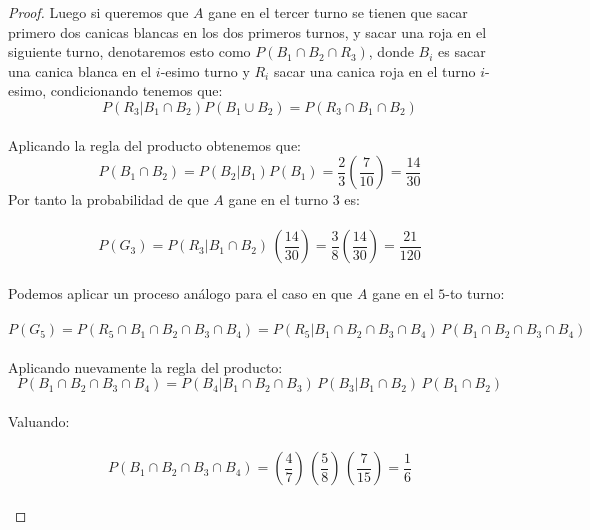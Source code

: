 \documentclass[11pt,letterpaper]{article}
\begin{document}
\begin{proof}
    Luego si queremos que $A$ gane en el tercer turno se tienen que sacar primero dos canicas blancas en los dos primeros turnos, y sacar una roja en el siguiente turno, denotaremos esto como $P(B_1\cap B_2\cap R_3)$, donde $B_i$ es sacar una canica blanca en el $i$-esimo turno
    y $R_i$ sacar una canica roja en el turno $i$-esimo, condicionando tenemos que:\,\\
    \begin{equation*}
        P(R_3|B_1\cap B_2)P(B_1\cup B_2)=P(R_3\cap B_1 \cap B_2)
    \end{equation*}\,\\
    Aplicando la regla del producto obtenemos que:\,\\
    \begin{equation*}
        P(B_1\cap B_2)=P(B_2|B_1)P(B_1)=\frac{2}{3}\left(\frac{7}{10}\right)=\frac{14}{30}
    \end{equation*}
    Por tanto la probabilidad de que $A$ gane en el turno $3$ es:\,\\
    \,\\
    \begin{equation*}
        P(G_3)= P(R_3|B_1\cap B_2)\,\left(\frac{14}{30}\right)=\frac{3}{8}\left(\frac{14}{30}\right)=\frac{21}{120}
    \end{equation*}\,\\
    Podemos aplicar un proceso an\'alogo para el caso en que $A$ gane en el $5$-to turno:\,\\
    \,\\
    \begin{equation*}
        P(G_5)=P(R_5\cap B_1\cap B_2\cap B_3\cap B_4)=P(R_5|B_1\cap B_2\cap B_3\cap B_4)\,P(B_1\cap B_2\cap B_3\cap B_4)
    \end{equation*}\,\\
    Aplicando nuevamente la regla del producto:\,\\
    \begin{equation*}
        P(B_1\cap B_2\cap B_3\cap B_4)=P(B_4|B_1\cap B_2\cap B_3)\,P(B_3|B_1\cap B_2)\,P(B_1\cap B_2)
    \end{equation*}\,\\
    Valuando:\,\\
    \,\\
    \begin{equation*}
        P(B_1\cap B_2\cap B_3\cap B_4)=\left(\frac{4}{7}\right)\,\left(\frac{5}{8}\right)\,\left(\frac{7}{15}\right)=\frac{1}{6}
    \end{equation*}\,\\

\end{proof}
\end{document}
